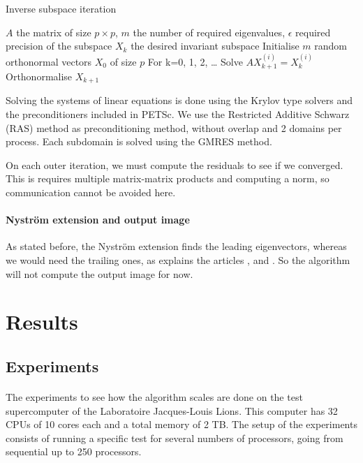 \begin{algorithm}[H]
 \caption{Inverse subspace iteration}
 \begin{algorithmic}
  \REQUIRE \(A\) the matrix of size \(p \times p\), \(m\) the number of required eigenvalues, \(\epsilon\) required precision of the subspace
  \ENSURE \(X_k\) the desired invariant subspace
  \STATE Initialise \(m\) random orthonormal vectors \(X_0\) of size \(p\)
  \STATE For k=0, 1, 2, \dots
    \STATE Solve \(A X_{k+1}^{(i)} = X_k^{(i)}\)
   \ENDFOR
   \STATE Orthonormalise \(X_{k+1}\)
  \ENDWHILE
 \end{algorithmic}
\end{algorithm}

Solving the systems of linear equations is done using the Krylov type solvers and the preconditioners included in PETSc.
We use the Restricted Additive Schwarz (RAS) method as preconditioning method, without overlap and 2 domains per process.
Each subdomain is solved using the GMRES method.

On each outer iteration, we must compute the residuals to see if we converged.
This is requires multiple matrix-matrix products and computing a norm, so communication cannot be avoided here.

\paragraph{Nystr\"om extension and output image}
As stated before, the Nystr\"om extension finds the leading eigenvectors, whereas we would need the trailing ones, as explains the articles \cite{belongie_spectral_2002}, \cite{fowlkes_spectral_2004} and \cite{glide_2014}.
So the algorithm will not compute the output image for now.

\section{Results}

\subsection{Experiments}

\paragraph{}
The experiments to see how the algorithm scales are done on the test supercomputer of the Laboratoire Jacques-Louis Lions.
This computer has 32 CPUs of 10 cores each and a total memory of 2 TB.
The setup of the experiments consists of running a specific test for several numbers of processors, going from sequential up to 250 processors.

